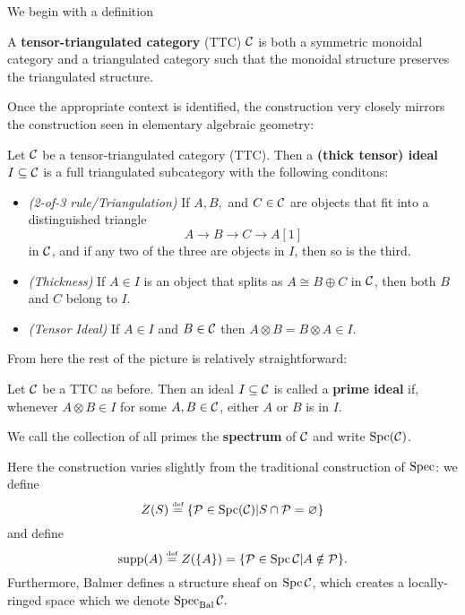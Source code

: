 \documentclass [11pt, proquest] {uwthesis}[2020/02/24]
\DeclareMathOperator{\Spc}{Spc}
\begin{document}
    We begin with a definition
    \begin{defn}
    	A \textbf{tensor-triangulated category} (TTC) $\mathcal{C}$ is both a symmetric monoidal category and a triangulated category such that 
    	the monoidal structure preserves the triangulated structure. 
    \end{defn}

    Once the appropriate context is identified, the construction 
    very closely mirrors the construction seen in elementary algebraic geometry:
    \begin{defn}
    	Let $\mathcal{C}$ be a tensor-triangulated category (TTC). Then a \textbf{(thick tensor) ideal} $I\subseteq \mathcal{C}$ is a full triangulated subcategory 
    	with the following conditons:
    	\begin{itemize}
    		\item \textit{(2-of-3 rule/Triangulation)} If $A,B,$ and $C\in\mathcal{C}$ are objects that fit into a distinguished triangle
    		\[A\to B\to C\to A[1]\]
    		in $\mathcal{C}$, and if any two of the three are objects in $I$, then so is the third.
    		\item \textit{(Thickness)} If $A\in I$ is an object that splits as $A\cong B\oplus C$ in $\mathcal{C}$, then both $B$ and $C$ belong to $I$.
    		\item \textit{(Tensor Ideal)} If $A\in I$ and $B\in \mathcal{C}$ then $A\otimes B=B\otimes A\in I$.
    	\end{itemize}
    \end{defn}
    
    From here the rest of the picture is relatively straightforward:
    \begin{defn}
    	Let $\mathcal{C}$ be a TTC as before. Then an ideal $I\subseteq\mathcal{C}$ is called a \textbf{prime ideal}
    	if, whenever $A\otimes B\in I$ for some $A,B\in \mathcal{C}$, either $A$ or $B$ is in $I$.
    
    	We call the collection of all primes the \textbf{spectrum} of $\mathcal{C}$ and write 
    	$\operatorname{Spc}(\mathcal{C})$.
    \end{defn}
    
    Here the construction varies slightly from the traditional construction of $\operatorname{Spec}$: we define 
    \[Z(S)\eqdef\{\calP\in\Spc(\calC)|S\cap\calP=\varnothing\}\]
    and define 
    \[\supp(A)\eqdef Z(\{A\})=\{\calP\in\Spc\calC|A\notin \calP\}.\]
    Furthermore, Balmer defines a structure sheaf on $\Spc\calC$, which creates a locally-ringed space which we denote $\operatorname{Spec}_\text{Bal}\mathcal{C}.$
    
\end{document}

